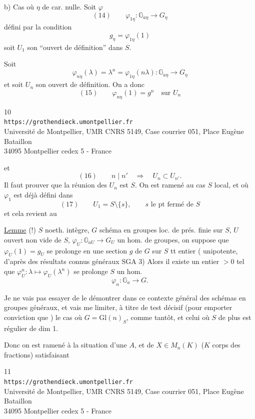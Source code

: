 b) Cas où $\eta$ de car. nulle. Soit $\varphi$
\[
(14)\qquad \varphi_{1\eta}:\mathbb G_{a\eta}\longrightarrow G_\eta
\]
défini par la condition
\[
g_\eta=\varphi_{1\eta}(1)
\]
soit $U_1$ son ``ouvert de définition'' dans $S$.

Soit
\[
\varphi_{n\eta}(\lambda)=\lambda^n=\varphi_{1\eta}(n\lambda):\mathbb G_{a\eta}\longrightarrow G_\eta
\]
et soit $U_n$ son ouvert de définition. On a donc
\[
(15)\qquad\varphi_{n\eta}(1)=g^n\quad\text{sur }U_n
\]

\begin{center}
\small
10\\
\texttt{https://grothendieck.umontpellier.fr}\\
Université de Montpellier, UMR CNRS 5149, Case courrier 051, Place Eugène Bataillon\\
34095 Montpellier cedex 5 - France
\end{center}

et
\[
(16)\qquad n\mid n'\quad\Longrightarrow\quad U_n\subset U_{n'}.
\]
Il faut prouver que la réunion des $U_n$ est $S$. On est ramené au cas $S$ local, et où $\varphi_1$ est déjà défini dans
\[
(17)\qquad U_1=S\setminus\{s\},\qquad s\text{ le pt fermé de }S
\]
et cela revient au

\uline{Lemme} (!)  $S$ noeth. intègre, $G$ schéma en groupes  loc. de prés. finie sur $S$, $U$ ouvert non vide de $S$, $\varphi_U:\mathbb G_{aU}\longrightarrow G_U$ un hom. de groupes, on suppose que $\varphi_U(1)=g_U$ se prolonge en une section $g$ de $G$ sur $S$ tt entier ( unipotente, d'après des résultats connus généraux  SGA 3) Alors il existe un entier $>0$ tel que $\varphi_U^n:\lambda\longmapsto\varphi_U(\lambda^n)$ se prolonge  $S$ un hom.
\[
\varphi_n:\mathbb G_a\longrightarrow G.
\]

Je ne vais pas essayer de le démontrer dans ce contexte général des schémas en groupes généraux, et vais me limiter, à titre de test décisif (pour emporter conviction que ) le cas où $G=\mathrm{Gl}(n)_S$, comme tantôt, et celui où $S$ de plus est régulier de dim 1.

Donc on est ramené à la situation d'une  $A$, et de $X\in M_n(K)$ ($K$ corps des fractions) satisfaisant

\begin{center}
\small
11\\
\texttt{https://grothendieck.umontpellier.fr}\\
Université de Montpellier, UMR CNRS 5149, Case courrier 051, Place Eugène Bataillon\\
34095 Montpellier cedex 5 - France
\end{center}

